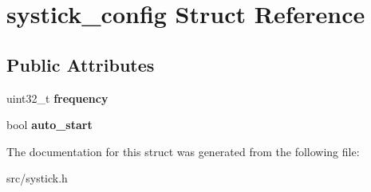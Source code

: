 \hypertarget{structsystick__config}{}\section{systick\+\_\+config Struct Reference}
\label{structsystick__config}
\subsection*{Public Attributes}
\begin{DoxyCompactItemize}
\item 
\hypertarget{structsystick__config_a4234a833cb468e5ebe169bef99cb9235}{}uint32\+\_\+t {\bfseries frequency}\label{structsystick__config_a4234a833cb468e5ebe169bef99cb9235}

\item 
\hypertarget{structsystick__config_aa9f9da280ed0e328cdd0d0648a46aaad}{}bool {\bfseries auto\+\_\+start}\label{structsystick__config_aa9f9da280ed0e328cdd0d0648a46aaad}

\end{DoxyCompactItemize}


The documentation for this struct was generated from the following file\+:\begin{DoxyCompactItemize}
\item 
src/systick.\+h\end{DoxyCompactItemize}
